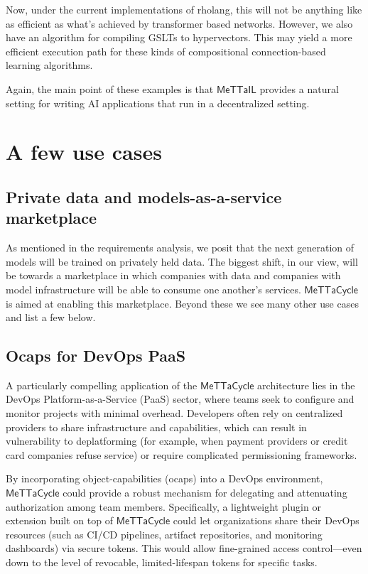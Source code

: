 \documentclass{article}
\newcommand{\MC}{\mathsf{MeTTaCycle}}
\begin{document}
Now, under the current implementations of rholang, this will not be
anything like as efficient as what's achieved by transformer based
networks. However, we also have an algorithm for compiling GSLTs to
hypervectors. This may yield a more efficient execution path for these
kinds of compositional connection-based learning algorithms.

Again, the main point of these examples is that $\mathsf{MeTTaIL}$
provides a natural setting for writing AI applications that run in a
decentralized setting.

\section{A few use cases}

\subsection{Private data and models-as-a-service marketplace}

As mentioned in the requirements analysis, we posit that the next
generation of models will be trained on privately held data. The
biggest shift, in our view, will be towards a marketplace in which
companies with data and companies with model infrastructure will be
able to consume one another's services. $\MC$ is aimed at enabling
this marketplace. Beyond these we see many other use cases and list a
few below.

\subsection{Ocaps for DevOps PaaS}

A particularly compelling application of the $\MC$ architecture lies
in the DevOps Platform-as-a-Service (PaaS) sector, where teams seek to
configure and monitor projects with minimal overhead. Developers often
rely on centralized providers to share infrastructure and
capabilities, which can result in vulnerability to deplatforming (for
example, when payment providers or credit card companies refuse
service) or require complicated permissioning frameworks.

By incorporating object-capabilities (ocaps) into a DevOps
environment, $\MC$ could provide a robust mechanism for delegating and
attenuating authorization among team members. Specifically, a
lightweight plugin or extension built on top of $\MC$ could let
organizations share their DevOps resources (such as CI/CD pipelines,
artifact repositories, and monitoring dashboards) via secure
tokens. This would allow fine-grained access control---even down to
the level of revocable, limited-lifespan tokens for specific tasks.
\end{document}
